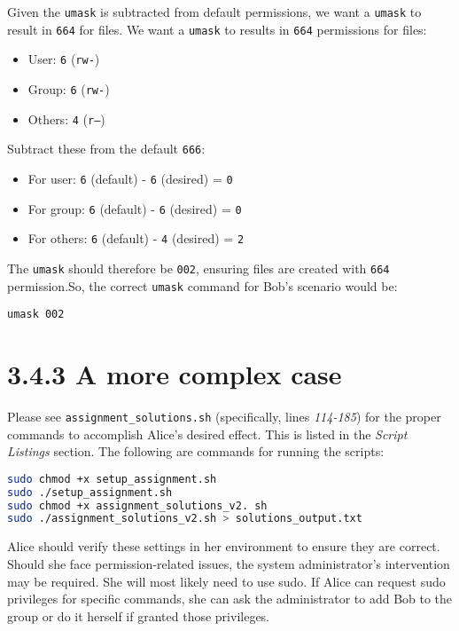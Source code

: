 \documentclass{article}
\begin{document}
Given the \texttt{umask} is subtracted from default permissions, we want a \texttt{umask} to result in \texttt{664} for files. We want a \texttt{umask} to results in \texttt{664} permissions for files:

\begin{itemize}
    \item User: \texttt{6} (\texttt{rw-})
    \item Group: \texttt{6} (\texttt{rw-})
    \item Others: \texttt{4} (\texttt{r--})
\end{itemize}

Subtract these from the default \texttt{666}:

\begin{itemize}
    \item For user: \texttt{6} (default) - \texttt{6} (desired) = \texttt{0}
    \item For group: \texttt{6} (default) - \texttt{6} (desired) = \texttt{0}
    \item For others: \texttt{6} (default) - \texttt{4} (desired) = \texttt{2}
\end{itemize}

The \texttt{umask} should therefore be \texttt{002}, ensuring files are created with \texttt{664} permission.So, the correct \texttt{umask} command for Bob's scenario would be:

\begin{verbatim}
umask 002
\end{verbatim}

\section*{3.4.3 A more complex case}

Please see \texttt{assignment\_solutions.sh} (specifically, lines \textit{114-185}) for the proper commands to accomplish Alice's desired effect. This is listed in the \textit{Script Listings} section. The following are commands for running the scripts: 

\begin{lstlisting}[language=bash]
sudo chmod +x setup_assignment.sh
sudo ./setup_assignment.sh
sudo chmod +x assignment_solutions_v2. sh
sudo ./assignment_solutions_v2.sh > solutions_output.txt
\end{lstlisting}

{\color{red}Alice should verify these settings in her environment to ensure they are correct. Should she face permission-related issues, the system administrator’s intervention may be required. She will most likely need to use sudo. If Alice can request sudo privileges for specific commands, she can ask the administrator to add Bob to the group or do it herself if granted those privileges. }
\end{document}
